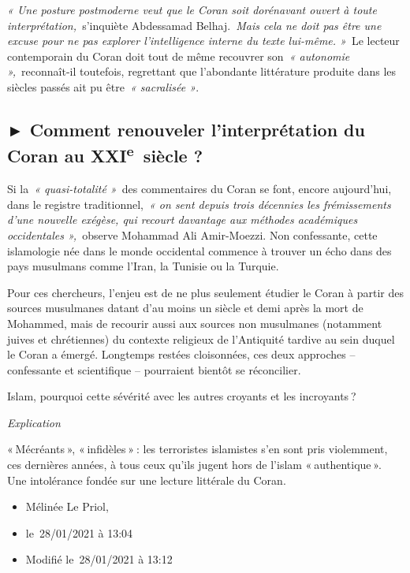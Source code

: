  

\emph{« Une posture postmoderne veut que le Coran soit dorénavant ouvert
à toute interprétation,~}s'inquiète Abdessamad Belhaj.\emph{~Mais cela
ne doit pas être une excuse pour ne pas explorer l'intelligence interne
du texte lui-même. »}~Le lecteur contemporain du Coran doit tout de même
recouvrer son~\emph{« autonomie »,}~reconnaît-il toutefois, regrettant
que l'abondante littérature produite dans les siècles passés ait pu
être~\emph{« sacralisée »}.

\subsection{► Comment renouveler l'interprétation du Coran au
XXI\textsuperscript{e}~siècle ?}

Si la~\emph{« quasi-totalité »}~des commentaires du Coran se font,
encore aujourd'hui, dans le registre traditionnel,~\emph{« on sent
depuis trois décennies les frémissements d'une nouvelle exégèse, qui
recourt davantage aux méthodes académiques occidentales »,~}observe
Mohammad Ali Amir-Moezzi. Non confessante, cette islamologie née dans le
monde occidental commence à trouver un écho dans des pays musulmans
comme l'Iran, la Tunisie ou la Turquie.

 

Pour ces chercheurs, l'enjeu est de ne plus seulement étudier le Coran à
partir des sources musulmanes datant d'au moins un siècle et demi après
la mort de Mohammed, mais de recourir aussi aux sources non musulmanes
(notamment juives et chrétiennes) du contexte religieux de l'Antiquité
tardive au sein duquel le Coran a émergé. Longtemps restées cloisonnées,
ces deux approches -- confessante et scientifique -- pourraient bientôt
se réconcilier.

Islam, pourquoi cette sévérité avec les autres croyants et les
incroyants ?

\emph{Explication~}

« Mécréants », « infidèles » : les terroristes islamistes s'en sont pris
violemment, ces dernières années, à tous ceux qu'ils jugent hors de
l'islam « authentique ». Une intolérance fondée sur une lecture
littérale du Coran. 

\begin{itemize}
\item
  Mélinée Le Priol,~
\item
  le~28/01/2021 à 13:04~
\item
  Modifié le~28/01/2021 à 13:12
\end{itemize}

